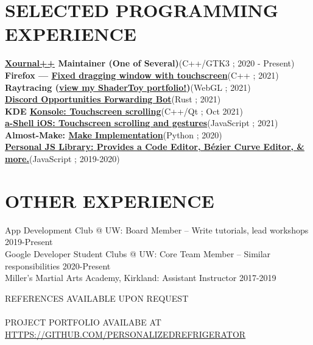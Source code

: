 \documentclass[12pt,letterpaper]{extarticle}
\begin{document}
  \section{SELECTED PROGRAMMING EXPERIENCE}
  \newcommand\prExpEntry[3]{\textbf{#1}\hfill (#2 ; #3) \\}
  \prExpEntry{\href{https://github.com/xournalpp/xournalpp}{Xournal++} Maintainer (One of Several)}{C++/GTK3}{2020 - Present}
  \prExpEntry{Firefox --- \href{https://phabricator.services.mozilla.com/D129349}{Fixed dragging window with touchscreen}}{C++}{2021}
  \prExpEntry{Raytracing (\href{https://shadertoy.com/user/personalizedrefrigerator}{view my ShaderToy portfolio!})}{WebGL}{2021}
  \prExpEntry{\href{https://github.com/UWAppDev/opportunities-forwarding-bot}{Discord Opportunities Forwarding Bot}}{Rust}{2021}
  \prExpEntry{KDE \href{https://invent.kde.org/utilities/konsole/-/merge_requests/516}{Konsole: Touchscreen scrolling}}{C++/Qt}{Oct 2021}
  \prExpEntry{\href{https://github.com/holzschu/a-shell/pull/246}{{a-Shell iOS}: Touchscreen scrolling and gestures}}{JavaScript}{2021}
  \prExpEntry{Almost-Make: \href{https://github.com/personalizedrefrigerator/AlmostMake}{Make Implementation}}{Python}{2020}
  \prExpEntry{\href{https://github.com/personalizedrefrigerator/LibJS}{{\footnotesize Personal JS Library:} {\small Provides a Code Editor, Bézier Curve Editor, \& more.}}}{JavaScript}{2019-2020}

  \section{OTHER EXPERIENCE}
  App Development Club @ UW: Board Member -- {\footnotesize Write tutorials, lead workshops} \hfill 2019-Present\\
  Google Developer Student Clubs @ UW: Core Team Member -- {\footnotesize Similar responsibilities} \hfill 2020-Present\\
  Miller's Martial Arts Academy, Kirkland: Assistant Instructor \hfill 2017-2019

  \begin{center}
    REFERENCES AVAILABLE UPON REQUEST\\\phantom{;}\\
    PROJECT PORTFOLIO AVAILABE AT \url{HTTPS://GITHUB.COM/PERSONALIZEDREFRIGERATOR}
  \end{center}
\end{document}

